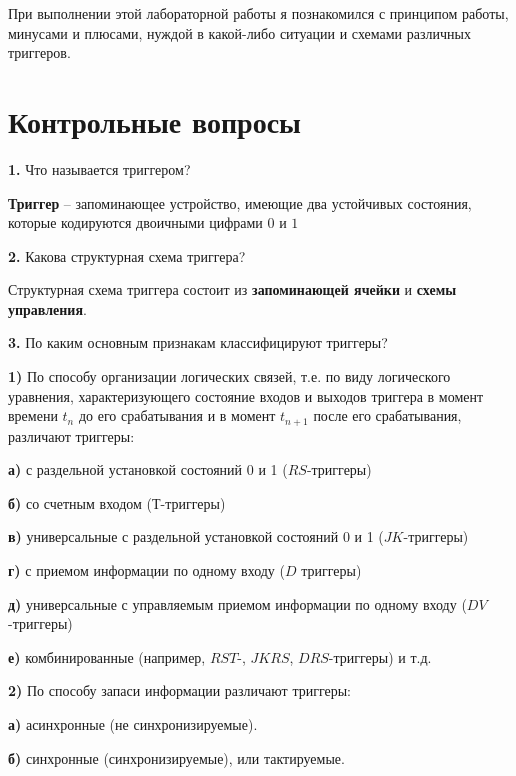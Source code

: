 \documentclass[a4paper,12pt]{article}
\begin{document}
\noindent При выполнении этой лабораторной работы я познакомился с принципом работы, минусами и плюсами, нуждой в какой-либо ситуации и схемами различных триггеров.

\section{Контрольные вопросы}

\noindent\textbf{1.} Что называется триггером?\newline

\noindent\textbf{Триггер} -- запоминающее устройство, имеющие два устойчивых состояния, которые кодируются двоичными цифрами $0$ и $1$\newline

\noindent\textbf{2.} Какова структурная схема триггера? \newline

\noindent Структурная схема триггера состоит из \textbf{запоминающей ячейки} и \textbf{схемы управления}.\newline

\noindent\textbf{3.} По каким основным признакам классифицируют триггеры?\newline

\noindent\textbf{1) }По способу организации логических связей, т.е. по виду логического уравнения, характеризующего состояние входов и выходов триггера в момент времени $t_{n}$ до его срабатывания и в момент $t_{n+1}$ после его срабатывания, различают триггеры: 

\textbf{а) } с раздельной установкой состояний 0 и 1 ($RS$-триггеры)

\textbf{б) } со счетным входом ($Т$-триггеры)

\textbf{в) } универсальные с раздельной установкой состояний 0 и 1 ($JK$-триггеры)

\textbf{г) } с приемом информации по одному входу ($D$ триггеры)

\textbf{д) } универсальные с управляемым приемом информации по одному входу ($DV$-триггеры)

\textbf{е) } комбинированные (например, $RST$-, $JKRS$, $DRS$-триггеры) и т.д.\newline

\noindent\textbf{2) }По способу запаси информации различают триггеры: 

\textbf{а) } асинхронные (не синхронизируемые).

\textbf{б) } синхронные (синхронизируемые), или тактируемые.\newline
\end{document}
